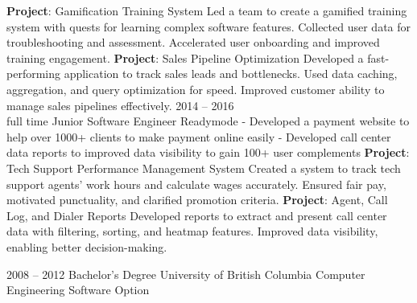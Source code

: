 \documentclass[9pt]{developercv} %
\begin{document}
\begin{entrylist}
{            \textbf{Project}: Gamification Training System\newline
            Led a team to create a gamified training system with quests for learning complex software features. 
            Collected user data for troubleshooting and assessment. 
            Accelerated user onboarding and improved training engagement. \newline\newline
            \textbf{Project}: Sales Pipeline Optimization\newline
            Developed a fast-performing application to track sales leads and bottlenecks. 
            Used data caching, aggregation, and query optimization for speed. 
            Improved customer ability to manage sales pipelines effectively.\newline
        }
	\entry
		{2014 -- 2016\\\footnotesize{full time}}
		{Junior Software Engineer}
		{Readymode}
		{
            - Developed a payment website to help over 1000+ clients to make payment online easily\newline
            - Developed call center data reports to improved data visibility to gain 100+ user complements\newline
            \newline
            \textbf{Project}: Tech Support Performance Management System\newline
            Created a system to track tech support agents' work hours and calculate wages accurately. 
            Ensured fair pay, motivated punctuality, and clarified promotion criteria. 
            \newline\newline
            \textbf{Project}: Agent, Call Log, and Dialer Reports\newline
            Developed reports to extract and present call center data with filtering, sorting, and heatmap features. 
            Improved data visibility, enabling better decision-making.\newline
        }
\end{entrylist}



\begin{entrylist}
	\entry
		{2008 -- 2012}
		{Bachelor's Degree}
		{University of British Columbia}
		{Computer Engineering Software Option}
\end{entrylist}
\end{document}
